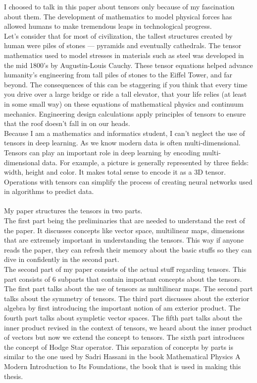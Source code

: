 \documentclass[12pt,a4paper]{article}
\begin{document}
\newpage
I choosed to talk in this paper about tensors only because of my fascination about them. The development of mathematics to model physical forces has allowed humans to make tremendous leaps in technological progress.\\
Let’s consider that for most of civilization, the tallest structures created by human were piles of stones — pyramids and eventually cathedrals.
The tensor mathematics used to model stresses in materials such as steel was developed in the mid 1800’s by Augustin-Louis Cauchy. These tensor equations helped advance humanity’s engineering from tall piles of stones to the Eiffel Tower, and far beyond.
The consequences of this can be staggering if you think that every time you drive over a large bridge or ride a tall elevator, that your life relies (at least in some small way) on these equations of mathematical physics and continuum mechanics. Engineering design calculations apply principles of tensors to ensure that the roof doesn’t fall in on our heads.\\
Because I am a mathematics and informatics student, I can't neglect the use of tensors in deep learning. As we know modern data is often multi-dimensional. Tensors can play an important role in deep learning by encoding multi-dimensional data. For example, a picture is generally represented by three fields: width, height and color. It makes total sense to encode it as a 3D tensor.  Operations with tensors can simplify the process of creating neural networks used in algorithms to predict data.\\\\
My paper structures the tensors in two parts.\\The first part being the preliminaries that are needed to understand the rest of the paper. It discusses concepts like vector space, multilinear maps, dimensions that are extremely important in understanding the tensors. This way if anyone reads the paper, they can refresh their memory about the basic stuffs so they can dive in confidently in the second part.\\
The second part of my paper consists of the actual stuff regarding tensors. This part consists of 6 subparts that contain important concepts about the tensors.\\The first part talks about the use of tensors as multilinear maps. The second part talks about the symmetry of tensors. The third part discusses about the exterior algebra by first introducing the important notion of am exterior product. The fourth part talks about sympletic vector spaces. The fifth part talks about the inner product revised in the context of tensors, we heard about the inner product of vectors but now we extend the concept to tensors. The sixth part introduces the concept of Hodge Star operator. This separation of concepts by parts is similar to the one used by Sadri Hassani in the book Mathematical Physics A Modern Introduction to Its Foundations, the book that is used in making this thesis. 
\newpage 
\end{document}
